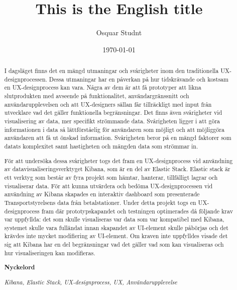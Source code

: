 \documentclass{kththesis}
\title{This is the English title}
\author{Osquar Studnt}
\date{\today}
\begin{document}
\frontmatter

\titlepage
\begin{otherlanguage}{swedish}
  \begin{abstract}
I dagsläget finns det en mängd utmaningar och svårigheter inom den traditionella UX-designprocessen. Dessa utmaningar har en påverkan på hur tidskrävande och kostsam en UX-designprocess kan vara. Några av dem är att få prototyper att likna slutprodukten med avseende på funktionalitet, användargränssnitt och användarupplevelsen och att UX-designers sällan får tillräckligt med input från utvecklare vad det gäller funktionella begränsningar. Det finns även svårigheter vid visualisering av data, mer specifikt strömmande data. Svårigheten ligger i att göra informationen i data så lättförståelig för användaren som möjligt och att möjliggöra användaren att få ut önskad information. Svårigheten beror på en mängd faktorer som datats komplexitet samt hastigheten och mängden data som strömmar in. 

För att undersöka dessa svårigheter togs det fram en UX-designprocess vid användning av datavisualiseringsverktyget Kibana, som är en del av Elastic Stack. Elastic stack är ett verktyg som består av fyra projekt som hämtar, hanterar, tillfälligt lagrar och visualiserar data. För att kunna utvärdera och bedöma UX-designprocessen vid användning av Kibana skapades en interaktiv dashboard som presenterade Transportstyrelsens data från betalstationer. Under detta projekt togs en UX-designprocess fram där prototypskapandet och testningen optimerades då följande krav var uppfyllda: det som skulle visualiseras var data som var kompatibel med Kibana, systemet skulle vara fulländat innan skapandet av UI-element skulle påbörjas och det krävdes inte mycket modifiering av UI-element. Om kraven inte uppfylldes visade det sig att Kibana har en del begränsningar vad det gäller vad som kan visualiseras och hur visualiseringen kan modifieras. 

\textbf{Nyckelord}

\textit{Kibana, Elastic Stack, UX-designprocess, UX, Användarupplevelse}

 \end{abstract}
\end{otherlanguage}
 
\end{document}
